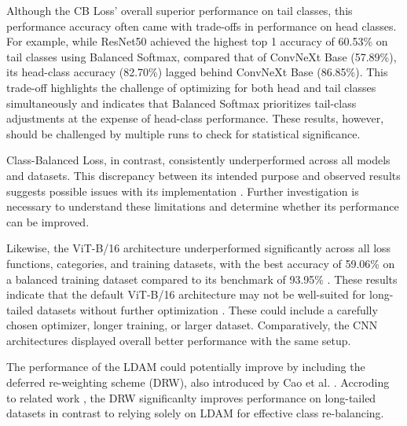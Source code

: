 Although the CB Loss' overall superior performance on tail classes, this performance accuracy often came with trade-offs in performance on head classes. For example, while ResNet50 achieved the highest top 1 accuracy of 60.53\% on tail classes using Balanced Softmax, compared that of ConvNeXt Base (57.89\%), its head-class accuracy (82.70\%) lagged behind ConvNeXt Base (86.85\%). This trade-off highlights the challenge of optimizing for both head and tail classes simultaneously and indicates that Balanced Softmax prioritizes tail-class adjustments at the expense of head-class performance. These results, however, should be challenged by multiple runs to check for statistical significance.

Class-Balanced Loss, in contrast, consistently underperformed across all models and datasets. This discrepancy between its intended purpose and observed results suggests possible issues with its implementation . Further investigation is necessary to understand these limitations and determine whether its performance can be improved. 

Likewise, the ViT-B/16 architecture underperformed significantly across all loss functions, categories, and training datasets, with the best accuracy of 59.06\% on a balanced training dataset compared to its benchmark of 93.95\% . These results indicate that the default ViT-B/16 architecture may not be well-suited for long-tailed datasets without further optimization \cite{menon2021longtaillearninglogitadjustment,loshchilov2018fixing}. These could include a carefully chosen optimizer, longer training, or larger dataset. Comparatively, the CNN architectures displayed overall better performance with the same setup. 



The performance of the LDAM could potentially improve by including the deferred re-weighting scheme (DRW), also introduced by Cao et al. \cite{cao2019learningimbalanceddatasetslabeldistributionaware}. Accroding to related work , the DRW significanlty improves performance on long-tailed datasets in contrast to relying solely on LDAM for effective class re-balancing. 

